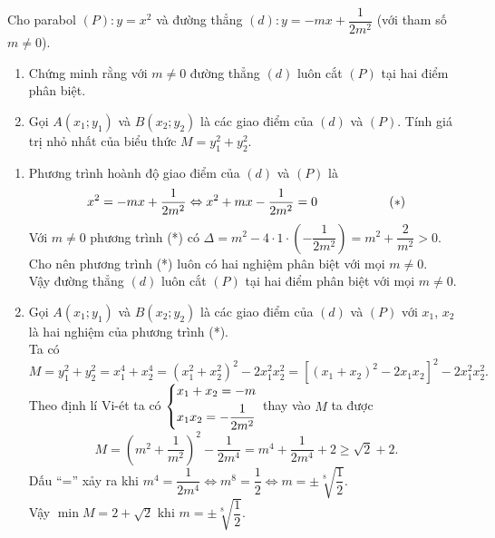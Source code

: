 \begin{ex}%
 Cho parabol $(P): y = x^2$ và đường thẳng $(d): y = -mx + \dfrac{1}{2m^2}$ (với tham số $m \neq 0$).
 \begin{enumerate}
  \item Chứng minh rằng với $m \neq 0$ đường thẳng $(d)$ luôn cắt $(P)$ tại hai điểm phân biệt.
  \item Gọi $A(x_1; y_1)$ và $B(x_2; y_2)$ là các giao điểm của $(d)$ và $(P)$. Tính giá trị nhỏ nhất của biểu thức $M = y_1^2 + y_2^2$.
 \end{enumerate}
 \loigiai
  {
  \begin{enumerate}
   \item Phương trình hoành độ giao điểm của $(d)$ và $(P)$ là 
   $$x^2 = -mx + \dfrac{1}{2m^2} \Leftrightarrow x^2 + mx - \dfrac{1}{2m^2} = 0 \hspace*{2cm} (*)$$
   Với $m \neq 0$ phương trình (*) có $\Delta = m^2 - 4 \cdot 1 \cdot \left( -\dfrac{1}{2m^2} \right) = m^2 + \dfrac{2}{m^2} > 0$.\\
   Cho nên phương trình (*) luôn có hai nghiệm phân biệt với mọi $m \neq 0$.\\
   Vậy đường thẳng $(d)$ luôn cắt $(P)$ tại hai điểm phân biệt với mọi $m \neq 0$.
   
   \item Gọi $A(x_1; y_1)$ và $B(x_2; y_2)$ là các giao điểm của $(d)$ và $(P)$ với $x_1$, $x_2$ là hai nghiệm của phương trình (*).\\
   Ta có
   $$M = y_1^2 + y_2^2 = x_1^4 + x_2^4 = \left( x_1^2 + x_2^2 \right)^2 - 2x_1^2 x_2^2 = \left[ \left( x_1 + x_2 \right)^2 - 2x_1 x_2 \right]^2 - 2x_1^2 x_2^2 .$$
   Theo định lí Vi-ét ta có $\left\{\begin{aligned}& x_1 + x_2 = -m \\& x_1 x_2 = -\dfrac{1}{2m^2}\end{aligned}\right.$ thay vào $M$ ta được
   $$M = \left( m^2 + \dfrac{1}{m^2} \right)^2 - \dfrac{1}{2m^4} = m^4 + \dfrac{1}{2m^4} + 2 \geq \sqrt{2} + 2.$$
   Dấu ``='' xảy ra khi $m^4  = \dfrac{1}{2m^4} \Leftrightarrow m^8 = \dfrac{1}{2} \Leftrightarrow m = \pm \sqrt[8]{\dfrac{1}{2}}$.\\
   Vậy $\min M = 2 + \sqrt{2}$ khi $m = \pm \sqrt[8]{\dfrac{1}{2}}$.
  \end{enumerate}
  }
\end{ex}


